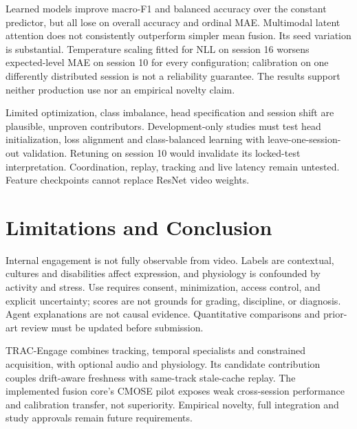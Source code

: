 \documentclass[a4paper,conference]{IEEEtran}
\begin{document}
Learned models improve macro-F1 and balanced accuracy over the constant predictor, but all lose on overall accuracy and ordinal MAE. Multimodal latent attention does not consistently outperform simpler mean fusion. Its seed variation is substantial. Temperature scaling fitted for NLL on session 16 worsens expected-level MAE on session 10 for every configuration; calibration on one differently distributed session is not a reliability guarantee. The results support neither production use nor an empirical novelty claim.

Limited optimization, class imbalance, head specification and session shift are plausible, unproven contributors. Development-only studies must test head initialization, loss alignment and class-balanced learning with leave-one-session-out validation. Retuning on session 10 would invalidate its locked-test interpretation. Coordination, replay, tracking and live latency remain untested. Feature checkpoints cannot replace ResNet video weights.

\section{Limitations and Conclusion}
Internal engagement is not fully observable from video. Labels are contextual, cultures and disabilities affect expression, and physiology is confounded by activity and stress. Use requires consent, minimization, access control, and explicit uncertainty; scores are not grounds for grading, discipline, or diagnosis. Agent explanations are not causal evidence. Quantitative comparisons and prior-art review must be updated before submission.

TRAC-Engage combines tracking, temporal specialists and constrained acquisition, with optional audio and physiology. Its candidate contribution couples drift-aware freshness with same-track stale-cache replay. The implemented fusion core's CMOSE pilot exposes weak cross-session performance and calibration transfer, not superiority. Empirical novelty, full integration and study approvals remain future requirements.
\end{document}
